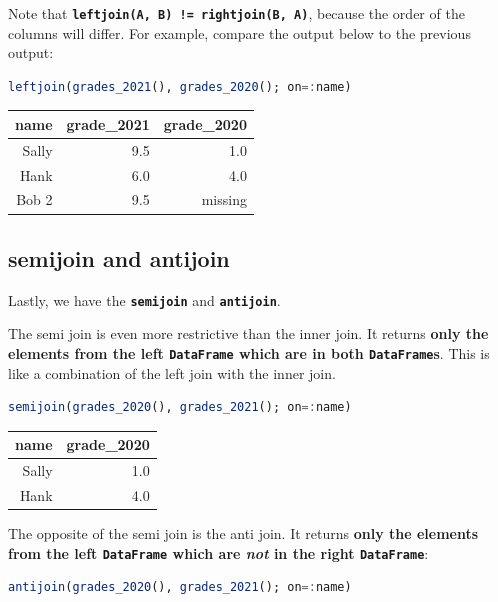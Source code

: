 \documentclass[
  notoc %
]{tufte-book}
\newcommand{\passthrough}[1]{#1}
\begin{document}
Note that
\textbf{\passthrough{\lstinline"leftjoin(A, B) != rightjoin(B, A)"}},
because the order of the columns will differ. For example, compare the
output below to the previous output:

\begin{lstlisting}[language=Julia]
leftjoin(grades_2021(), grades_2020(); on=:name)
\end{lstlisting}

\begin{longtable}[]{@{}rrr@{}}
\toprule
name & grade\_2021 & grade\_2020 \\
\midrule
\endhead
Sally & 9.5 & 1.0 \\
Hank & 6.0 & 4.0 \\
Bob 2 & 9.5 & missing \\
\bottomrule
\end{longtable}

\hypertarget{sec:semijoin_antijoin}{%
\subsection{semijoin and antijoin}\label{sec:semijoin_antijoin}}

Lastly, we have the \textbf{\passthrough{\lstinline!semijoin!}} and
\textbf{\passthrough{\lstinline!antijoin!}}.

The semi join is even more restrictive than the inner join. It returns
\textbf{only the elements from the left
\passthrough{\lstinline!DataFrame!} which are in both
\passthrough{\lstinline!DataFrame!}s}. This is like a combination of the
left join with the inner join.

\begin{lstlisting}[language=Julia]
semijoin(grades_2020(), grades_2021(); on=:name)
\end{lstlisting}

\begin{longtable}[]{@{}rr@{}}
\toprule
name & grade\_2020 \\
\midrule
\endhead
Sally & 1.0 \\
Hank & 4.0 \\
\bottomrule
\end{longtable}

The opposite of the semi join is the anti join. It returns \textbf{only
the elements from the left \passthrough{\lstinline!DataFrame!} which are
\emph{not} in the right \passthrough{\lstinline!DataFrame!}}:

\begin{lstlisting}[language=Julia]
antijoin(grades_2020(), grades_2021(); on=:name)
\end{lstlisting}
\end{document}
